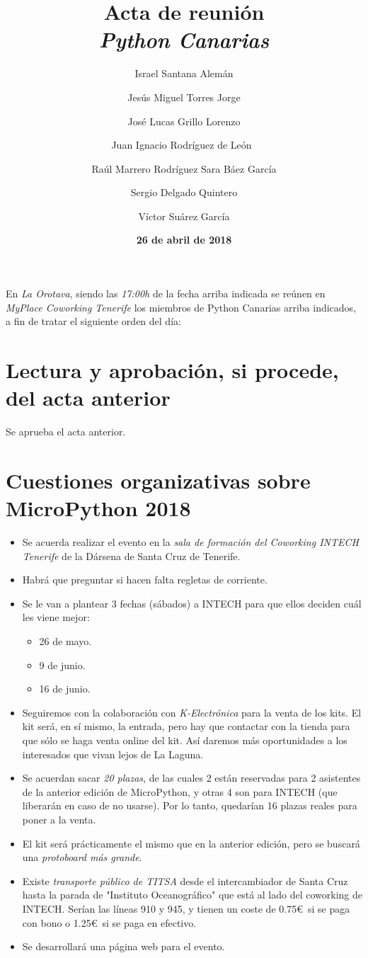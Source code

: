 \documentclass[a4paper, 12pt]{article}
\title{\huge \textbf{Acta de reunión} \\ \textit{Python Canarias}}
\date{\textbf{26 de abril de 2018}}
\author{
    Israel Santana Alemán \and
    Jesús Miguel Torres Jorge \and
    José Lucas Grillo Lorenzo \and
    Juan Ignacio Rodríguez de León\ \and 
    Raúl Marrero Rodríguez
    Sara Báez García \and
    Sergio Delgado Quintero \and 
    Víctor Suárez García \and 
}
\begin{document}
\renewcommand{\contentsname}{Orden del día}

\maketitle

En \textit{La Orotava}, siendo las \textit{17:00h} de la fecha arriba indicada se reúnen en \textit{MyPlace Coworking Tenerife} los miembros de Python Canarias arriba indicados, a fin de tratar el siguiente orden del día:

\tableofcontents

\section{Lectura y aprobación, si procede, del acta anterior}

Se aprueba el acta anterior.

\section{Cuestiones organizativas sobre MicroPython 2018}

\begin{itemize}
    \item Se acuerda realizar el evento en la \textit{sala de formación del Coworking INTECH Tenerife} de la Dársena de Santa Cruz de Tenerife.
    \item Habrá que preguntar si hacen falta regletas de corriente.
    \item Se le van a plantear 3 fechas (sábados) a INTECH para que ellos deciden cuál les viene mejor:
        \begin{itemize}
            \item 26 de mayo.
            \item 9 de junio.
            \item 16 de junio.
        \end{itemize}
    \item Seguiremos con la colaboración con \textit{K-Electrónica} para la venta de los kits. El kit será, en sí mismo, la entrada, pero hay que contactar con la tienda para que sólo se haga venta online del kit. Así daremos más oportunidades a los interesados que vivan lejos de La Laguna.
    \item Se acuerdan sacar \textit{20 plazas}, de las cuales 2 están reservadas para 2 asistentes de la anterior edición de MicroPython, y otras 4 son para INTECH (que liberarán en caso de no usarse). Por lo tanto, quedarían 16 plazas reales para poner a la venta.
    \item El kit será prácticamente el mismo que en la anterior edición, pero se buscará una \textit{protoboard más grande}.
    \item Existe \textit{transporte público de TITSA} desde el intercambiador de Santa Cruz hasta la parada de "Instituto Oceanográfico" que está al lado del coworking de INTECH. Serían las líneas 910 y 945, y tienen un coste de 0.75\euro\ si se paga con bono o 1.25\euro\ si se paga en efectivo.
    \item Se desarrollará una página web para el evento.
\end{itemize}
\end{document}

